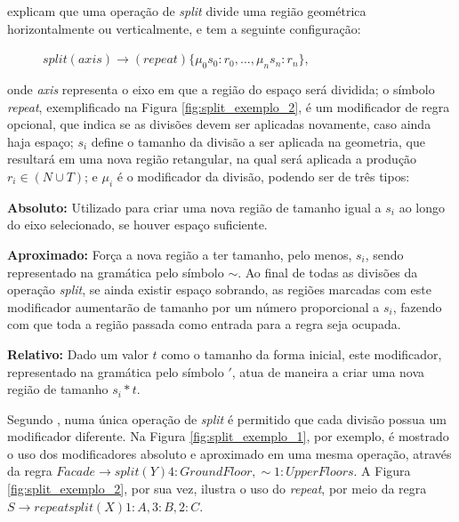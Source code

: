 explicam que uma operação de \textit{split} divide uma região geométrica horizontalmente ou verticalmente, e tem a seguinte configuração:

\vspace{0.2cm}

\begin{description}
    \item[] \qquad \qquad $split(axis) \rightarrow (repeat)\{\mu_0 s_0 : r_0, ... , \mu_n s_n : r_n \}$,
\end{description}

\vspace{0.2cm}

\noindent onde \textit{axis} representa o eixo em que a região do espaço será dividida; o símbolo \textit{repeat}, exemplificado na Figura \ref{fig:split_exemplo_2}, é um modificador de regra opcional, que indica se as divisões devem ser aplicadas novamente, caso ainda haja espaço; $s_i$ define o tamanho da divisão a ser aplicada na geometria, que resultará em uma nova região retangular, na qual será aplicada a produção $r_i \in (N \cup T)$; e $\mu_i$ é o modificador da divisão, podendo ser de três tipos:

\textbf{Absoluto:} Utilizado para criar uma nova região de tamanho igual a $s_i$ ao longo do eixo selecionado, se houver espaço suficiente.

\textbf{Aproximado:} Força a nova região a ter tamanho, pelo menos, $s_i$, sendo representado na gramática pelo símbolo $\sim$. Ao final de todas as divisões da operação \textit{split}, se ainda existir espaço sobrando, as regiões marcadas com este modificador aumentarão de tamanho por um número proporcional a $s_i$, fazendo com que toda a região passada como entrada para a regra seja ocupada.

\textbf{Relativo:} Dado um valor $t$ como o tamanho da forma inicial, este modificador, representado na gramática pelo símbolo $'$, atua de maneira a criar uma nova região de tamanho $s_i * t$.

Segundo , numa única operação de \textit{split} é permitido que cada divisão possua um modificador diferente. Na Figura \ref{fig:split_exemplo_1}, por exemplo, é mostrado o uso dos modificadores absoluto e aproximado em uma mesma operação, através da regra $Facade \rightarrow split(Y){4 : GroundFloor, \sim 1 : UpperFloors}$. A Figura \ref{fig:split_exemplo_2}, por sua vez, ilustra o uso do \textit{repeat}, por meio da regra $S \rightarrow repeat split(X){1 : A, 3 : B, 2 : C}$.

